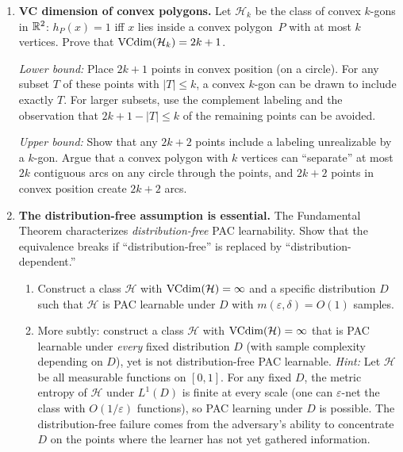 \begin{enumerate}[leftmargin=*,itemsep=6pt]

\item \textbf{VC dimension of convex polygons.}
  Let $\mathcal{H}_k$ be the class of convex $k$-gons in $\mathbb{R}^2$:
  $h_P(x) = 1$ iff $x$ lies inside a convex polygon~$P$ with at
  most $k$ vertices.  Prove that $\mathrm{VCdim}(\mathcal{H}_k) = 2k + 1$.

  \emph{Lower bound:} Place $2k+1$ points in convex position
  (on a circle).  For any subset $T$ of these points with
  $|T| \leq k$, a convex $k$-gon can be drawn to include exactly
  $T$.  For larger subsets, use the complement labeling and the
  observation that $2k+1 - |T| \leq k$ of the remaining points
  can be avoided.

  \emph{Upper bound:} Show that any $2k+2$ points include a
  labeling unrealizable by a $k$-gon.  Argue that a convex
  polygon with $k$ vertices can ``separate'' at most $2k$
  contiguous arcs on any circle through the points, and $2k+2$
  points in convex position create $2k+2$ arcs.

\item \textbf{The distribution-free assumption is essential.}
  The Fundamental Theorem characterizes \emph{distribution-free}
  PAC learnability.  Show that the equivalence breaks if
  ``distribution-free'' is replaced by ``distribution-dependent.''
  \begin{enumerate}[label=(\alph*)]
  \item Construct a class $\mathcal{H}$ with $\mathrm{VCdim}(\mathcal{H}) =
    \infty$ and a specific distribution $D$ such that $\mathcal{H}$
    is PAC learnable under $D$ with $m(\varepsilon, \delta) = O(1)$
    samples.
  \item More subtly: construct a class $\mathcal{H}$ with
    $\mathrm{VCdim}(\mathcal{H}) = \infty$ that is PAC learnable under
    \emph{every} fixed distribution $D$ (with sample complexity
    depending on $D$), yet is not distribution-free PAC learnable.
    \emph{Hint:}  Let $\mathcal{H}$ be all measurable functions on
    $[0,1]$.  For any fixed $D$, the metric entropy of $\mathcal{H}$
    under $L^1(D)$ is finite at every scale (one can $\varepsilon$-net
    the class with $O(1/\varepsilon)$ functions), so PAC learning
    under $D$ is possible.  The distribution-free failure comes from
    the adversary's ability to concentrate $D$ on the points where
    the learner has not yet gathered information.
  \end{enumerate}


\end{enumerate}
